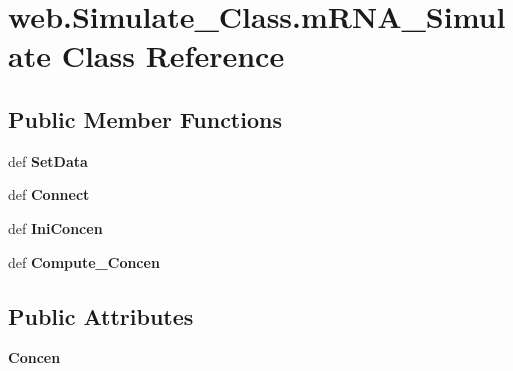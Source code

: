 \hypertarget{classweb_1_1_simulate___class_1_1m_r_n_a___simulate}{\section{web.\-Simulate\-\_\-\-Class.\-m\-R\-N\-A\-\_\-\-Simulate Class Reference}
\label{classweb_1_1_simulate___class_1_1m_r_n_a___simulate}
}
\subsection*{Public Member Functions}
\begin{DoxyCompactItemize}
\item 
\hypertarget{classweb_1_1_simulate___class_1_1m_r_n_a___simulate_aafa306e52e6cd8565e2abc96336bacbf}{def {\bfseries Set\-Data}}\label{classweb_1_1_simulate___class_1_1m_r_n_a___simulate_aafa306e52e6cd8565e2abc96336bacbf}

\item 
\hypertarget{classweb_1_1_simulate___class_1_1m_r_n_a___simulate_a4af7cedb8c3df5fcd581affc57e7afca}{def {\bfseries Connect}}\label{classweb_1_1_simulate___class_1_1m_r_n_a___simulate_a4af7cedb8c3df5fcd581affc57e7afca}

\item 
\hypertarget{classweb_1_1_simulate___class_1_1m_r_n_a___simulate_a8b9036fb94041c3247f18ab5b7d28216}{def {\bfseries Ini\-Concen}}\label{classweb_1_1_simulate___class_1_1m_r_n_a___simulate_a8b9036fb94041c3247f18ab5b7d28216}

\item 
\hypertarget{classweb_1_1_simulate___class_1_1m_r_n_a___simulate_ab96aa173aa7a27b60a60c3cddc05b41b}{def {\bfseries Compute\-\_\-\-Concen}}\label{classweb_1_1_simulate___class_1_1m_r_n_a___simulate_ab96aa173aa7a27b60a60c3cddc05b41b}

\end{DoxyCompactItemize}
\subsection*{Public Attributes}
\begin{DoxyCompactItemize}
\item 
\hypertarget{classweb_1_1_simulate___class_1_1m_r_n_a___simulate_a89a68a9662a7c802b3b9d7436649920f}{{\bfseries Concen}}\label{classweb_1_1_simulate___class_1_1m_r_n_a___simulate_a89a68a9662a7c802b3b9d7436649920f}

\end{DoxyCompactItemize}
